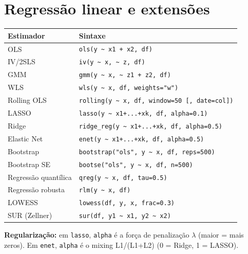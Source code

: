 \section{Regressão linear e extensões}

\begin{center}
\begin{tabular}{ll}
\toprule
\textbf{Estimador} & \textbf{Sintaxe} \\
\midrule
OLS               & \texttt{ols(y \textasciitilde{} x1 + x2, df)} \\
IV/2SLS           & \texttt{iv(y \textasciitilde{} x, \textasciitilde{} z, df)} \\
GMM               & \texttt{gmm(y \textasciitilde{} x, \textasciitilde{} z1 + z2, df)} \\
WLS               & \texttt{wls(y \textasciitilde{} x, df, weights="w")} \\
Rolling OLS       & \texttt{rolling(y \textasciitilde{} x, df, window=50 [, date=col])} \\
\midrule
LASSO             & \texttt{lasso(y \textasciitilde{} x1+...+xk, df, alpha=0.1)} \\
Ridge             & \texttt{ridge\_reg(y \textasciitilde{} x1+...+xk, df, alpha=0.5)} \\
Elastic Net       & \texttt{enet(y \textasciitilde{} x1+...+xk, df, alpha=0.5)} \\
\midrule
Bootstrap         & \texttt{bootstrap("ols", y \textasciitilde{} x, df, reps=500)} \\
Bootstrap SE      & \texttt{bootse("ols", y \textasciitilde{} x, df, n=500)} \\
\midrule
Regressão quantílica & \texttt{qreg(y \textasciitilde{} x, df, tau=0.5)} \\
Regressão robusta    & \texttt{rlm(y \textasciitilde{} x, df)} \\
LOWESS               & \texttt{lowess(df, y, x, frac=0.3)} \\
\midrule
SUR (Zellner)     & \texttt{sur(df, y1 \textasciitilde{} x1, y2 \textasciitilde{} x2)} \\
\bottomrule
\end{tabular}
\end{center}

{\footnotesize \textbf{Regularização:} em \texttt{lasso}, \texttt{alpha} é a força de
penalização $\lambda$ (maior = mais zeros). Em \texttt{enet}, \texttt{alpha}
é o mixing L1/(L1+L2) (0 = Ridge, 1 = LASSO).}

